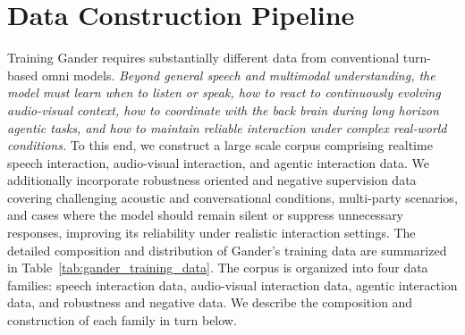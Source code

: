 \section{Data Construction Pipeline}

Training Gander requires substantially different data from conventional turn-based omni models. \textit{Beyond general speech and multimodal understanding, the model must learn when to listen or speak, how to react to continuously evolving audio-visual context, how to coordinate with the back brain during long horizon agentic tasks, and how to maintain reliable interaction under complex real-world conditions.} To this end, we construct a large scale corpus comprising realtime speech interaction, audio-visual interaction, and agentic interaction data. We additionally incorporate robustness oriented and negative supervision data covering challenging acoustic and conversational conditions, multi-party scenarios, and cases where the model should remain silent or suppress unnecessary responses, improving its reliability under realistic interaction settings. The detailed composition and distribution of Gander's training data are summarized in Table~\ref{tab:gander_training_data}. The corpus is organized into four data families: speech interaction data, audio-visual interaction data, agentic interaction data, and robustness and negative data. We describe the composition and construction of each family in turn below.






